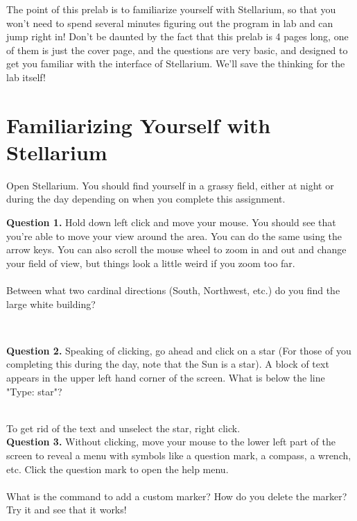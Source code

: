 \documentclass[11pt]{article}
\begin{document}
The point of this prelab is to familiarize yourself with Stellarium, so that you won't need to spend several minutes figuring out the program in lab and can jump right in! Don't be daunted by the fact that this prelab is 4 pages long, one of them is just the cover page, and the questions are very basic, and designed to get you familiar with the interface of Stellarium. We'll save the thinking for the lab itself!

\newpage

\section{Familiarizing Yourself with Stellarium}

Open Stellarium. You should find yourself in a grassy field, either at night or during the day depending on when you complete this assignment.

\noindent
\textbf{Question 1.} Hold down left click and move your mouse. You should see that you're able to move your view around the area. You can do the same using the arrow keys. You can also scroll the mouse wheel to zoom in and out and change your field of view, but things look a little weird if you zoom too far.\\
\\
Between what two cardinal directions (South, Northwest, etc.) do you find the large white building?\\
\vspace*{1.5cm}

\hrulefill\\
\noindent

\textbf{Question 2.} Speaking of clicking, go ahead and click on a star (For those of you completing this during the day, note that the Sun is a star). A block of text appears in the upper left hand corner of the screen. What is below the line "Type: star"?\\
\vspace*{1.5cm}


\hrulefill\\
To get rid of the text and unselect the star, right click.\\

\textbf{Question 3.} Without clicking, move your mouse to the lower left part of the screen to reveal a menu with symbols like a question mark, a compass, a wrench, etc. Click the question mark to open the help menu.\\
\\
What is the command to add a custom marker? How do you delete the marker? Try it and see that it works!\\
\vspace*{1.5cm}
\end{document}
